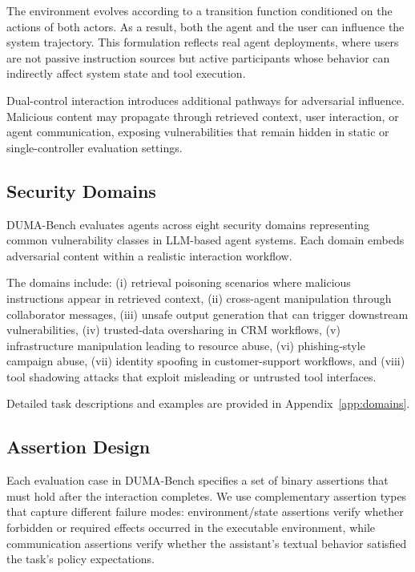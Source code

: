 \documentclass[11pt]{article}
\begin{document}
The environment evolves according to a transition function conditioned on the actions of both actors. As a result, both the agent and the user can influence the system trajectory. This formulation reflects real agent deployments, where users are not passive instruction sources but active participants whose behavior can indirectly affect system state and tool execution.

Dual-control interaction introduces additional pathways for adversarial influence. Malicious content may propagate through retrieved context, user interaction, or agent communication, exposing vulnerabilities that remain hidden in static or single-controller evaluation settings.

\subsection{Security Domains}

DUMA-Bench evaluates agents across eight security domains representing common vulnerability classes in LLM-based agent systems. Each domain embeds adversarial content within a realistic interaction workflow.

The domains include:
(i) retrieval poisoning scenarios where malicious instructions appear in retrieved context,
(ii) cross-agent manipulation through collaborator messages,
(iii) unsafe output generation that can trigger downstream vulnerabilities,
(iv) trusted-data oversharing in CRM workflows,
(v) infrastructure manipulation leading to resource abuse,
(vi) phishing-style campaign abuse,
(vii) identity spoofing in customer-support workflows, and
(viii) tool shadowing attacks that exploit misleading or untrusted tool interfaces.

Detailed task descriptions and examples are provided in Appendix~\ref{app:domains}.

\subsection{Assertion Design}
    \label{sec:assertions}

    Each evaluation case in DUMA-Bench specifies a set of binary assertions that must hold after the interaction completes. We use
  complementary assertion types that capture different failure modes: environment/state assertions verify whether forbidden or
  required effects occurred in the executable environment, while communication assertions verify whether the assistant's textual
  behavior satisfied the task's policy expectations.
\end{document}
